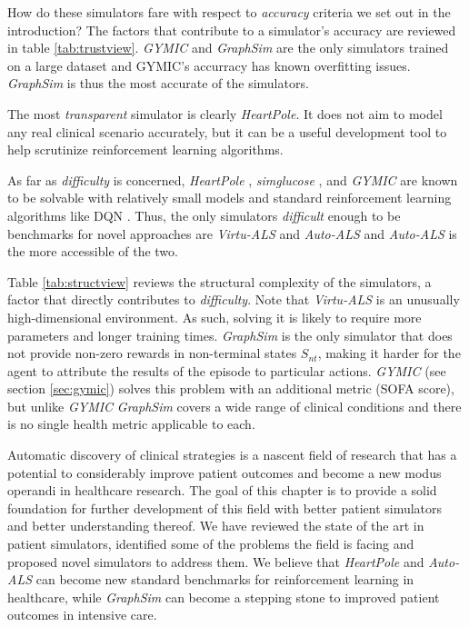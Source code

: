 How do these simulators fare with respect to \emph{accuracy} criteria we set out in the introduction? 
The factors that contribute to a simulator's accuracy are reviewed in table \ref{tab:trustview}.
\emph{GYMIC} and \emph{GraphSim} are the only simulators trained on a large dataset and GYMIC's accurracy has known overfitting issues.
\emph{GraphSim} is thus the most accurate of the simulators.

The most \emph{transparent} simulator is clearly \emph{HeartPole}.
It does not aim to model any real clinical scenario accurately, but it can be a useful development tool to help scrutinize reinforcement learning algorithms.

As far as \emph{difficulty} is concerned, \emph{HeartPole} \cite{heartpole}, \emph{simglucose} \cite{simglucose-baseline}, and \emph{GYMIC} \cite{gymic} are known to be solvable with relatively small models and standard reinforcement learning algorithms like DQN \cite{dqn}. 
Thus, the only simulators \emph{difficult} enough to be benchmarks for novel approaches are \emph{Virtu-ALS} and \emph{Auto-ALS} and \emph{Auto-ALS} is the more accessible of the two.

Table \ref{tab:structview} reviews the structural complexity of the simulators, a factor that directly contributes to \emph{difficulty}.
Note that \emph{Virtu-ALS} is an unusually high-dimensional environment.
As such, solving it is likely to require more parameters and longer training times.
\emph{GraphSim} is the only simulator that does not provide non-zero rewards in non-terminal states $S_{nt}$, making it harder for the agent to attribute the results of the episode to particular actions.
\emph{GYMIC} (see section \ref{sec:gymic}) solves this problem with an additional metric (SOFA score), but unlike \emph{GYMIC} \emph{GraphSim} covers a wide range of clinical conditions and there is no single health metric applicable to each.


Automatic discovery of clinical strategies is a nascent field of research that has a potential to considerably improve patient outcomes and become a new modus operandi in healthcare research.
The goal of this chapter is to provide a solid foundation for further development of this field with better patient simulators and better understanding thereof.
We have reviewed the state of the art in patient simulators, identified some of the problems the field is facing and proposed novel simulators to address them.
We believe that \emph{HeartPole} and \emph{Auto-ALS} can become new standard benchmarks for reinforcement learning in healthcare, while \emph{GraphSim} can become a stepping stone to improved patient outcomes in intensive care.

